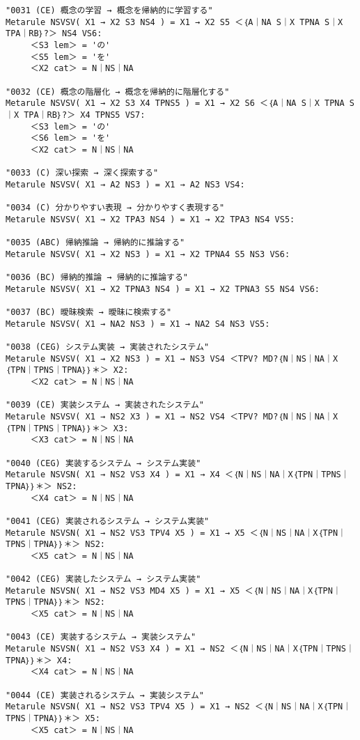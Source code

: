 {\begin{verbatim}
"0031 (CE) 概念の学習 → 概念を帰納的に学習する"
Metarule NSVSV( X1 → X2 S3 NS4 ) = X1 → X2 S5 ＜｛A｜NA S｜X TPNA S｜X TPA｜RB｝?＞ NS4 VS6:
     ＜S3 lem＞ = 'の'
     ＜S5 lem＞ = 'を'
     ＜X2 cat＞ = N｜NS｜NA

"0032 (CE) 概念の階層化 → 概念を帰納的に階層化する"
Metarule NSVSV( X1 → X2 S3 X4 TPNS5 ) = X1 → X2 S6 ＜｛A｜NA S｜X TPNA S｜X TPA｜RB｝?＞ X4 TPNS5 VS7:
     ＜S3 lem＞ = 'の'
     ＜S6 lem＞ = 'を'
     ＜X2 cat＞ = N｜NS｜NA

"0033 (C) 深い探索 → 深く探索する"
Metarule NSVSV( X1 → A2 NS3 ) = X1 → A2 NS3 VS4:

"0034 (C) 分かりやすい表現 → 分かりやすく表現する"
Metarule NSVSV( X1 → X2 TPA3 NS4 ) = X1 → X2 TPA3 NS4 VS5:

"0035 (ABC) 帰納推論 → 帰納的に推論する"
Metarule NSVSV( X1 → X2 NS3 ) = X1 → X2 TPNA4 S5 NS3 VS6:

"0036 (BC) 帰納的推論 → 帰納的に推論する"
Metarule NSVSV( X1 → X2 TPNA3 NS4 ) = X1 → X2 TPNA3 S5 NS4 VS6:

"0037 (BC) 曖昧検索 → 曖昧に検索する"
Metarule NSVSV( X1 → NA2 NS3 ) = X1 → NA2 S4 NS3 VS5:

"0038 (CEG) システム実装 → 実装されたシステム"
Metarule NSVSV( X1 → X2 NS3 ) = X1 → NS3 VS4 ＜TPV? MD?｛N｜NS｜NA｜X｛TPN｜TPNS｜TPNA｝｝＊＞ X2:
     ＜X2 cat＞ = N｜NS｜NA

"0039 (CE) 実装システム → 実装されたシステム"
Metarule NSVSV( X1 → NS2 X3 ) = X1 → NS2 VS4 ＜TPV? MD?｛N｜NS｜NA｜X｛TPN｜TPNS｜TPNA｝｝＊＞ X3:
     ＜X3 cat＞ = N｜NS｜NA

"0040 (CEG) 実装するシステム → システム実装"
Metarule NSVSN( X1 → NS2 VS3 X4 ) = X1 → X4 ＜｛N｜NS｜NA｜X｛TPN｜TPNS｜TPNA｝｝＊＞ NS2:
     ＜X4 cat＞ = N｜NS｜NA

"0041 (CEG) 実装されるシステム → システム実装"
Metarule NSVSN( X1 → NS2 VS3 TPV4 X5 ) = X1 → X5 ＜｛N｜NS｜NA｜X｛TPN｜TPNS｜TPNA｝｝＊＞ NS2:
     ＜X5 cat＞ = N｜NS｜NA

"0042 (CEG) 実装したシステム → システム実装"
Metarule NSVSN( X1 → NS2 VS3 MD4 X5 ) = X1 → X5 ＜｛N｜NS｜NA｜X｛TPN｜TPNS｜TPNA｝｝＊＞ NS2:
     ＜X5 cat＞ = N｜NS｜NA

"0043 (CE) 実装するシステム → 実装システム"
Metarule NSVSN( X1 → NS2 VS3 X4 ) = X1 → NS2 ＜｛N｜NS｜NA｜X｛TPN｜TPNS｜TPNA｝｝＊＞ X4:
     ＜X4 cat＞ = N｜NS｜NA

"0044 (CE) 実装されるシステム → 実装システム"
Metarule NSVSN( X1 → NS2 VS3 TPV4 X5 ) = X1 → NS2 ＜｛N｜NS｜NA｜X｛TPN｜TPNS｜TPNA｝｝＊＞ X5:
     ＜X5 cat＞ = N｜NS｜NA


\end{verbatim}}
